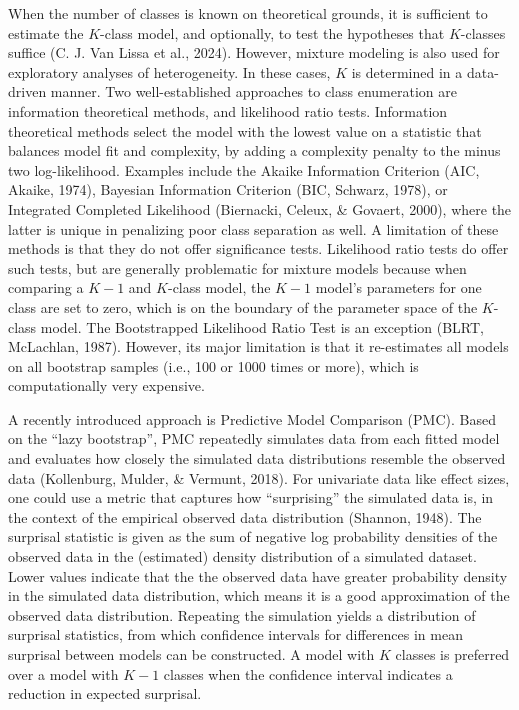 \documentclass[
  english,
  man, noextraspace,floatsintext]{apa6}
\begin{document}
When the number of classes is known on theoretical grounds, it is sufficient to estimate the \(K\)-class model, and optionally, to test the hypotheses that \(K\)-classes suffice (C. J. Van Lissa et al., 2024).
However, mixture modeling is also used for exploratory analyses of heterogeneity.
In these cases, \(K\) is determined in a data-driven manner.
Two well-established approaches to class enumeration are information theoretical methods, and likelihood ratio tests.
Information theoretical methods select the model with the lowest value on a statistic that balances model fit and complexity, by adding a complexity penalty to the minus two log-likelihood.
Examples include the Akaike Information Criterion (AIC, Akaike, 1974), Bayesian Information Criterion (BIC, Schwarz, 1978), or Integrated Completed Likelihood (Biernacki, Celeux, \& Govaert, 2000), where the latter is unique in penalizing poor class separation as well.
A limitation of these methods is that they do not offer significance tests.
Likelihood ratio tests do offer such tests, but are generally problematic for mixture models because when comparing a \(K-1\) and \(K\)-class model, the \(K-1\) model's parameters for one class are set to zero, which is on the boundary of the parameter space of the \(K\)-class model.
The Bootstrapped Likelihood Ratio Test is an exception (BLRT, McLachlan, 1987).
However, its major limitation is that it re-estimates all models on all bootstrap samples (i.e., 100 or 1000 times or more),
which is computationally very expensive.

A recently introduced approach is Predictive Model Comparison (PMC).
Based on the ``lazy bootstrap'', PMC repeatedly simulates data from each fitted model and evaluates how closely the simulated data distributions resemble the observed data (Kollenburg, Mulder, \& Vermunt, 2018).
For univariate data like effect sizes, one could use a metric that captures how ``surprising'' the simulated data is, in the context of the empirical observed data distribution (Shannon, 1948).
The surprisal statistic is given as the sum of negative log probability densities of the observed data in the (estimated) density distribution of a simulated dataset.
Lower values indicate that the the observed data have greater probability density in the simulated data distribution, which means it is a good approximation of the observed data distribution.
Repeating the simulation yields a distribution of surprisal statistics,
from which confidence intervals for differences in mean surprisal between models can be constructed.
A model with \(K\) classes is preferred over a model with \(K-1\) classes when the confidence interval indicates a reduction in expected surprisal.
\end{document}
